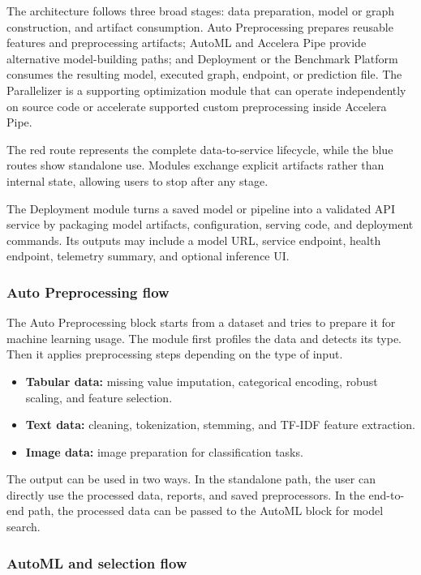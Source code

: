 \documentclass[12pt,a4paper]{report}
\begin{document}
The architecture follows three broad stages: data preparation, model or graph
construction, and artifact consumption. Auto Preprocessing prepares reusable
features and preprocessing artifacts; AutoML and Accelera Pipe provide
alternative model-building paths; and Deployment or the Benchmark Platform
consumes the resulting model, executed graph, endpoint, or prediction file. The
Parallelizer is a supporting optimization module that can operate independently
on source code or accelerate supported custom preprocessing inside Accelera
Pipe.

The red route represents the complete data-to-service lifecycle, while the blue
routes show standalone use. Modules exchange explicit artifacts rather than
internal state, allowing users to stop after any stage.

The Deployment module turns a saved model or pipeline into a validated API
service by packaging model artifacts, configuration, serving code, and deployment
commands. Its outputs may include a model URL, service endpoint, health endpoint,
telemetry summary, and optional inference UI.


\subsubsection*{Auto Preprocessing flow}

The Auto Preprocessing block starts from a dataset and tries to prepare it for
machine learning usage. The module first profiles the data and detects its type.
Then it applies preprocessing steps depending on the type of input.

\begin{itemize}
  \item \textbf{Tabular data:} missing value imputation, categorical encoding,
  robust scaling, and feature selection.
  \item \textbf{Text data:} cleaning, tokenization, stemming, and TF-IDF feature
  extraction.
  \item \textbf{Image data:} image preparation for classification tasks.
\end{itemize}

The output can be used in two ways. In the standalone path, the user can directly
use the processed data, reports, and saved preprocessors. In the end-to-end path,
the processed data can be passed to the AutoML block for model search.

\subsubsection*{AutoML and selection flow}
\end{document}
